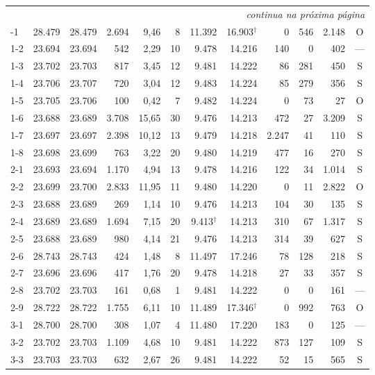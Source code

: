 {\begin{longtable}{@{}lrrrrrrrrrrc@{}}
\multicolumn{12}{r}{\emph{continua na próxima página}}\\
\endfoot
\bottomrule
\endlastfoot
1-1 & 28.479 & 28.479 & 2.694 & 9,46 & 8 & 11.392 & 16.903$^{\dagger}$ & 0 & 546 & 2.148 & O \\
1-2 & 23.694 & 23.694 & 542 & 2,29 & 10 & 9.478 & 14.216 & 140 & 0 & 402 & --- \\
1-3 & 23.702 & 23.703 & 817 & 3,45 & 12 & 9.481 & 14.222 & 86 & 281 & 450 & S \\
1-4 & 23.706 & 23.707 & 720 & 3,04 & 12 & 9.483 & 14.224 & 85 & 279 & 356 & S \\
1-5 & 23.705 & 23.706 & 100 & 0,42 & 7 & 9.482 & 14.224 & 0 & 73 & 27 & O \\
1-6 & 23.688 & 23.689 & 3.708 & 15,65 & 30 & 9.476 & 14.213 & 472 & 27 & 3.209 & S \\
1-7 & 23.697 & 23.697 & 2.398 & 10,12 & 13 & 9.479 & 14.218 & 2.247 & 41 & 110 & S \\
1-8 & 23.698 & 23.699 & 763 & 3,22 & 20 & 9.480 & 14.219 & 477 & 16 & 270 & S \\
\midrule
2-1 & 23.693 & 23.694 & 1.170 & 4,94 & 13 & 9.478 & 14.216 & 122 & 34 & 1.014 & S \\
2-2 & 23.699 & 23.700 & 2.833 & 11,95 & 11 & 9.480 & 14.220 & 0 & 11 & 2.822 & O \\
2-3 & 23.688 & 23.689 & 269 & 1,14 & 10 & 9.476 & 14.213 & 104 & 30 & 135 & S \\
2-4 & 23.689 & 23.689 & 1.694 & 7,15 & 20 & 9.413$^{\dagger}$ & 14.213 & 310 & 67 & 1.317 & S \\
2-5 & 23.688 & 23.689 & 980 & 4,14 & 21 & 9.476 & 14.213 & 314 & 39 & 627 & S \\
2-6 & 28.743 & 28.743 & 424 & 1,48 & 8 & 11.497 & 17.246 & 78 & 128 & 218 & S \\
2-7 & 23.696 & 23.696 & 417 & 1,76 & 20 & 9.478 & 14.218 & 27 & 33 & 357 & S \\
2-8 & 23.702 & 23.703 & 161 & 0,68 & 1 & 9.481 & 14.222 & 0 & 0 & 161 & --- \\
2-9 & 28.722 & 28.722 & 1.755 & 6,11 & 10 & 11.489 & 17.346$^{\dagger}$ & 0 & 992 & 763 & O \\
\midrule
3-1 & 28.700 & 28.700 & 308 & 1,07 & 4 & 11.480 & 17.220 & 183 & 0 & 125 & --- \\
3-2 & 23.702 & 23.703 & 1.109 & 4,68 & 10 & 9.481 & 14.222 & 873 & 127 & 109 & S \\
3-3 & 23.703 & 23.703 & 632 & 2,67 & 26 & 9.481 & 14.222 & 52 & 15 & 565 & S \\

\end{longtable}}
